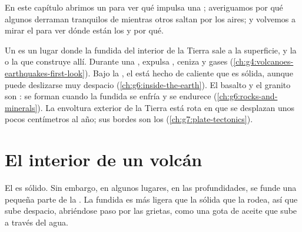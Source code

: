 En este capítulo abrimos un  para ver qué impulsa una ;
averiguamos por qué algunos  derraman tranquilos  de 
mientras otros saltan por los aires; y volvemos a mirar el  para
ver dónde están los  y por qué.

\begin{recall}
Un \emph{} es un lugar donde la  fundida del interior de la Tierra
sale a la superficie, y la  o la  que construye allí. Durante
una \emph{}, expulsa , ceniza y gases
(\cref{ch:g4:volcanoes-earthquakes-first-look}). Bajo la , el 
está hecho de  caliente que es sólida, aunque puede deslizarse muy
despacio (\cref{ch:g6:inside-the-earth}). El basalto y el granito son : se forman cuando la  fundida se enfría y se endurece
(\cref{ch:g6:rocks-and-minerals}). La envoltura exterior de la Tierra está
rota en  que se desplazan unos pocos centímetros al año; sus bordes
son los  (\cref{ch:g7:plate-tectonics}).
\end{recall}

\section{El interior de un volcán}

El  es sólido. Sin embargo, en algunos lugares, en las profundidades,
se funde una pequeña parte de la . La  fundida es más ligera que la
 sólida que la rodea, así que sube despacio, abriéndose paso por las
grietas, como una gota de aceite que sube a través del agua.

